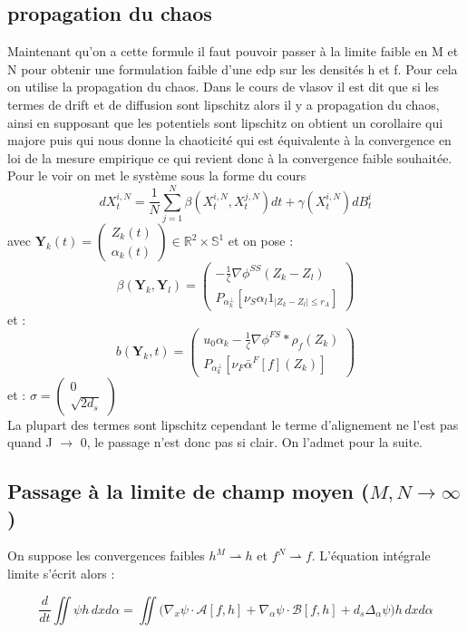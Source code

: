 \documentclass{article}
\begin{document}
\subsection{propagation du chaos}
Maintenant qu'on a cette formule il faut pouvoir passer à la limite faible en M et N pour obtenir une formulation faible d'une edp sur les densités h et f. Pour cela on utilise la propagation du chaos. Dans le cours de vlasov il est dit que si les termes de drift et de diffusion sont lipschitz alors il y a propagation du chaos, ainsi en supposant que les potentiels sont lipschitz on obtient un corollaire qui majore puis qui nous donne la chaoticité qui est équivalente à la convergence en loi de la mesure empirique ce qui revient donc à la convergence faible souhaitée.
Pour le voir on met le système sous la forme du cours
$$dX_t^{i,N} = \frac{1}{N}\sum_{j=1}^N \beta(X_t^{i,N}, X_t^{j,N})dt + \gamma(X_t^{i,N}) dB_t^i$$
avec $\mathbf{Y}_k(t) = \begin{pmatrix} Z_k(t) \\ \alpha_k(t) \end{pmatrix} \in \mathbb{R}^2 \times \mathbb{S}^1$
et on pose :
$$\beta(\mathbf{Y}_k, \mathbf{Y}_l) = \begin{pmatrix} - \frac{1}{\zeta} \nabla \phi^{SS}(Z_k - Z_l) \\ P_{\alpha_k^\perp} [\nu_S \alpha_l 1_{|Z_k - Z_l| \le r_A}] \end{pmatrix}$$
et :
$$b(\mathbf{Y}_k, t) = \begin{pmatrix} u_0 \alpha_k - \frac{1}{\zeta} \nabla \phi^{FS} * \rho_f(Z_k) \\ P_{\alpha_k^\perp} [\nu_F \bar{\alpha}^F[f](Z_k)] \end{pmatrix}$$
et :
$\sigma = \begin{pmatrix} 0 \\ \sqrt{2d_s} \end{pmatrix}$\\
La plupart des termes sont lipschitz cependant le terme d'alignement ne l'est pas quand J $\rightarrow$ 0, le passage n'est donc pas si clair. On l'admet pour la suite.

\subsection{Passage à la limite de champ moyen ($M, N \to \infty$)}
On suppose les convergences faibles $h^M \rightharpoonup h$ et $f^N \rightharpoonup f$.  L'équation intégrale limite s'écrit alors :

\begin{equation}
\frac{d}{dt} \iint \psi h \, dx d\alpha = \iint \Big( \nabla_x \psi \cdot \mathcal{A}[f,h] + \nabla_\alpha \psi \cdot \mathcal{B}[f,h] + d_s \Delta_\alpha \psi \Big) h \, dx d\alpha
\end{equation}
\end{document}

